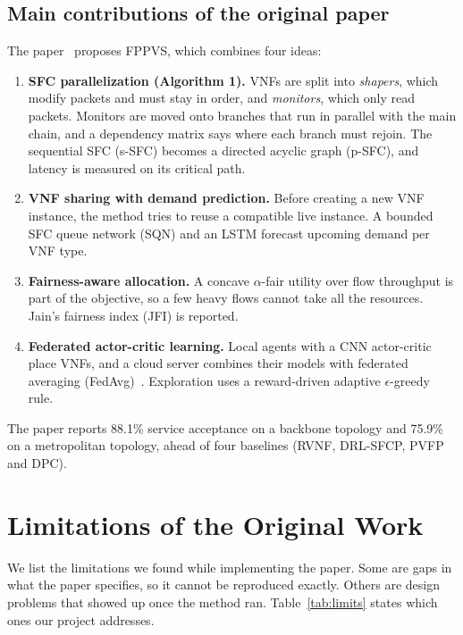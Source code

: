 \documentclass[11pt,a4paper]{article}
\begin{document}
\subsection{Main contributions of the original paper}
The paper~\cite{fppvs} proposes FPPVS, which combines four ideas:
\begin{enumerate}
  \item \textbf{SFC parallelization (Algorithm 1).} VNFs are split into
  \emph{shapers}, which modify packets and must stay in order, and
  \emph{monitors}, which only read packets. Monitors are moved onto branches
  that run in parallel with the main chain, and a dependency matrix says where
  each branch must rejoin. The sequential SFC (s-SFC) becomes a directed acyclic
  graph (p-SFC), and latency is measured on its critical path.
  \item \textbf{VNF sharing with demand prediction.} Before creating a new VNF
  instance, the method tries to reuse a compatible live instance. A bounded
  SFC queue network (SQN) and an LSTM forecast upcoming demand per VNF type.
  \item \textbf{Fairness-aware allocation.} A concave $\alpha$-fair utility over
  flow throughput is part of the objective, so a few heavy flows cannot take all
  the resources. Jain's fairness index (JFI) is reported.
  \item \textbf{Federated actor-critic learning.} Local agents with a CNN
  actor-critic place VNFs, and a cloud server combines their models with
  federated averaging (FedAvg)~\cite{fedavg}. Exploration uses a reward-driven
  adaptive $\epsilon$-greedy rule.
\end{enumerate}
The paper reports 88.1\% service acceptance on a backbone topology and 75.9\% on
a metropolitan topology, ahead of four baselines (RVNF, DRL-SFCP, PVFP and DPC).

\section{Limitations of the Original Work}

We list the limitations we found while implementing the paper. Some are gaps in
what the paper specifies, so it cannot be reproduced exactly. Others are design
problems that showed up once the method ran. Table~\ref{tab:limits} states which
ones our project addresses.
\end{document}

